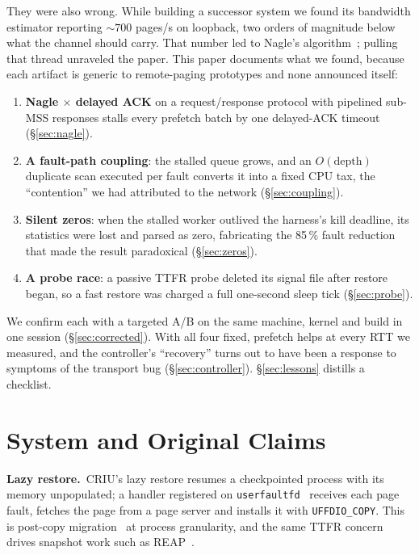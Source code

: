 \documentclass[conference]{IEEEtran}
\newcommand{\uffd}{\texttt{userfaultfd}\xspace}
\begin{document}
They were also wrong. While building a successor system we found its bandwidth
estimator reporting ${\sim}700$ pages/s on loopback, two orders of magnitude
below what the channel should carry. That number led to Nagle's
algorithm~\cite{rfc896}; pulling that thread unraveled the paper. This paper
documents what we found, because each artifact is generic to remote-paging
prototypes and none announced itself:

\begin{enumerate}
\item \textbf{Nagle $\times$ delayed ACK} on a request/response protocol with
pipelined sub-MSS responses stalls every prefetch batch by one delayed-ACK
timeout (\S\ref{sec:nagle}).
\item \textbf{A fault-path coupling}: the stalled queue grows, and an
$O(\text{depth})$ duplicate scan executed per fault converts it into a fixed
CPU tax, the ``contention'' we had attributed to the network
(\S\ref{sec:coupling}).
\item \textbf{Silent zeros}: when the stalled worker outlived the harness's
kill deadline, its statistics were lost and parsed as zero, fabricating the
85\,\% fault reduction that made the result paradoxical (\S\ref{sec:zeros}).
\item \textbf{A probe race}: a passive TTFR probe deleted its signal file after
restore began, so a fast restore was charged a full one-second sleep tick
(\S\ref{sec:probe}).
\end{enumerate}

\noindent We confirm each with a targeted A/B on the same machine, kernel and
build in one session (\S\ref{sec:corrected}). With all four fixed, prefetch
helps at every RTT we measured, and the controller's ``recovery'' turns out to
have been a response to symptoms of the transport bug (\S\ref{sec:controller}).
\S\ref{sec:lessons} distills a checklist.

\section{System and Original Claims}
\label{sec:system}

\textbf{Lazy restore.}\, CRIU's lazy restore resumes a checkpointed process
with its memory unpopulated; a handler registered on \uffd~\cite{userfaultfd}
receives each page fault, fetches the page from a page server and installs it
with \texttt{UFFDIO\_COPY}. This is post-copy migration~\cite{hines2009postcopy}
at process granularity, and the same TTFR concern drives snapshot work such as
REAP~\cite{ustiugov2021reap}.
\end{document}
